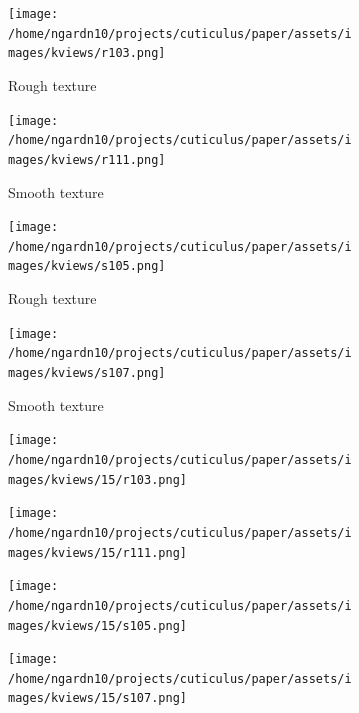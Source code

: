 \documentclass{aci}
\numberwithin{equation}{section}
\begin{document}
\newcommand{\segmentedsubwidth}{0.24\textwidth}
\begin{figure}
    \centering
    \begin{subfigure}{\segmentedsubwidth}
        \texttt{[image: /home/ngardn10/projects/cuticulus/paper/assets/images/kviews/r103.png]}
        \caption*{Rough texture}
    \end{subfigure}
    \begin{subfigure}{\segmentedsubwidth}
        \texttt{[image: /home/ngardn10/projects/cuticulus/paper/assets/images/kviews/r111.png]}
        \caption*{Smooth texture}
    \end{subfigure}
    \begin{subfigure}{\segmentedsubwidth}
        \texttt{[image: /home/ngardn10/projects/cuticulus/paper/assets/images/kviews/s105.png]}
        \caption*{Rough texture}
    \end{subfigure}
    \begin{subfigure}{\segmentedsubwidth}
        \texttt{[image: /home/ngardn10/projects/cuticulus/paper/assets/images/kviews/s107.png]}
        \caption*{Smooth texture}
    \end{subfigure}

    \begin{subfigure}{\segmentedsubwidth}
        \texttt{[image: /home/ngardn10/projects/cuticulus/paper/assets/images/kviews/15/r103.png]}
    \end{subfigure}
    \begin{subfigure}{\segmentedsubwidth}
        \texttt{[image: /home/ngardn10/projects/cuticulus/paper/assets/images/kviews/15/r111.png]}
    \end{subfigure}
    \begin{subfigure}{\segmentedsubwidth}
        \texttt{[image: /home/ngardn10/projects/cuticulus/paper/assets/images/kviews/15/s105.png]}
    \end{subfigure}
    \begin{subfigure}{\segmentedsubwidth}
        \texttt{[image: /home/ngardn10/projects/cuticulus/paper/assets/images/kviews/15/s107.png]}
    \end{subfigure}


\end{figure}
\end{document}
